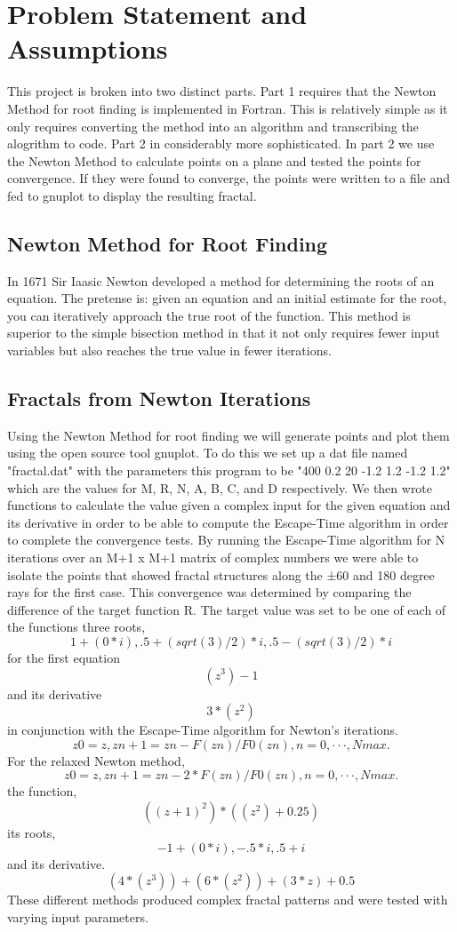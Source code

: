 \documentclass[11pt]{article}
\begin{document}
\section{Problem Statement and Assumptions}\label{S:2}
This project is broken into two distinct parts. Part 1 requires that the Newton Method for root finding is implemented in Fortran. This is relatively simple as it only requires converting the method into an algorithm and transcribing the alogrithm to code. Part 2 in considerably more sophisticated. In part 2 we use the Newton Method to calculate points on a plane and tested the points for convergence. If they were found to converge, the points were written to a file and fed to gnuplot to display the resulting fractal.


\subsection{Newton Method for Root Finding}\label{S:2.1}
In 1671 Sir Iaasic Newton developed a method for determining the roots of an equation. The pretense is: given an equation and an initial estimate for the root, you can iteratively approach the true root of the function. This method is superior to the simple bisection method in that it not only requires fewer input variables but also reaches the true value in fewer iterations. 

\subsection{Fractals from Newton Iterations}\label{S:2.2}
Using the Newton Method for root finding we will generate points and plot them using the open source tool gnuplot. To do this we set up a dat file named "fractal.dat" with the parameters this program to be "400 0.2 20 -1.2 1.2 -1.2 1.2" which are the values for M, R, N, A, B, C, and D respectively. We then wrote functions to calculate the value given a complex input for the given equation and its derivative in order to be able to compute the Escape-Time algorithm in order to complete the convergence tests. By running the Escape-Time algorithm for N iterations over an M+1 x M+1 matrix of complex numbers we were able to isolate the points that showed fractal structures along the ±60 and 180 degree rays for the first case. This convergence was determined by comparing the difference of the target function R. The target value was set to be one of each of the functions three roots, \[1+(0*i), .5+(sqrt(3)/2)*i, .5-(sqrt(3)/2)*i\] for the first equation \[(z^3) - 1\] and its derivative \[3*(z^2)\] in conjunction with the Escape-Time algorithm for Newton's iterations. \[z0 = z, zn+1 = zn − F(zn)/F0(zn), n = 0, · · · , Nmax.\] For the relaxed Newton method, \[z0 = z, zn+1 = zn − 2*F(zn)/F0(zn), n = 0, · · · , Nmax.\] the function, \[((z+1)^2)*((z^2)+0.25)\] its roots, \[-1+(0*i), -.5*i, .5+i\] and its derivative. \[(4*(z^3))+(6*(z^2))+(3*z)+0.5\] These different methods produced complex fractal patterns and were tested with varying input parameters. 
\end{document}
